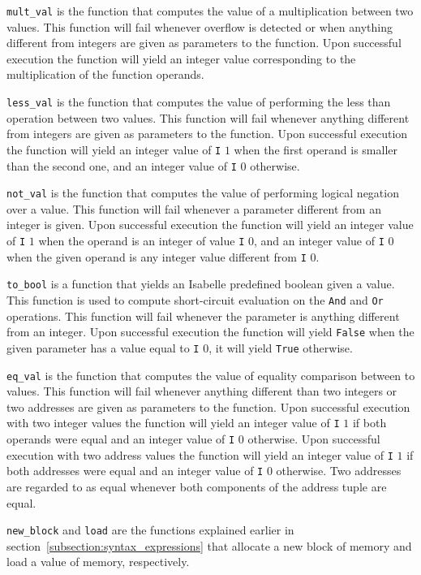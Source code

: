 \verb|mult_val| is the function that computes the value of a multiplication between two values.
This function will fail whenever overflow is detected or when anything different from integers are given as parameters to the function.
Upon successful execution the function will yield an integer value corresponding to the multiplication of the function operands.

\verb|less_val| is the function that computes the value of performing the less than operation between two values.
This function will fail whenever anything different from integers are given as parameters to the function.
Upon successful execution the function will yield an integer value of \verb|I| $1$ when the first operand is smaller than the second one, and an integer value of \verb|I| $0$ otherwise.

\verb|not_val| is the function that computes the value of performing logical negation over a value.
This function will fail whenever a parameter different from an integer is given.
Upon successful execution the function will yield an integer value of \verb|I| $1$ when the operand is an integer of value \verb|I| $0$, and an integer value of \verb|I| $0$ when the given operand is any integer value different from \verb|I| $0$.

\verb|to_bool| is a function that yields an Isabelle predefined boolean given a value.
This function is used to compute short-circuit evaluation on the \verb|And| and \verb|Or| operations.
This function will fail whenever the parameter is anything different from an integer.
Upon successful execution the function will yield \verb|False| when the given parameter has a value equal to \verb|I| $0$, it will yield \verb|True| otherwise.

\verb|eq_val| is the function that computes the value of equality comparison between to values.
This function will fail whenever anything different than two integers or two addresses are given as parameters to the function.
Upon successful execution with two integer values the function will yield an integer value of \verb|I| $1$ if both operands were equal and an integer value of \verb|I| $0$ otherwise.
Upon successful execution with two address values the function will yield an integer value of \verb|I| $1$ if both addresses were equal and an integer value of \verb|I| $0$ otherwise.
Two addresses are regarded to as equal whenever both components of the address tuple are equal.

\verb|new_block| and \verb|load| are the functions explained earlier in section~\ref{subsection:syntax_expressions} that allocate a new block of memory and load a value of memory, respectively.


